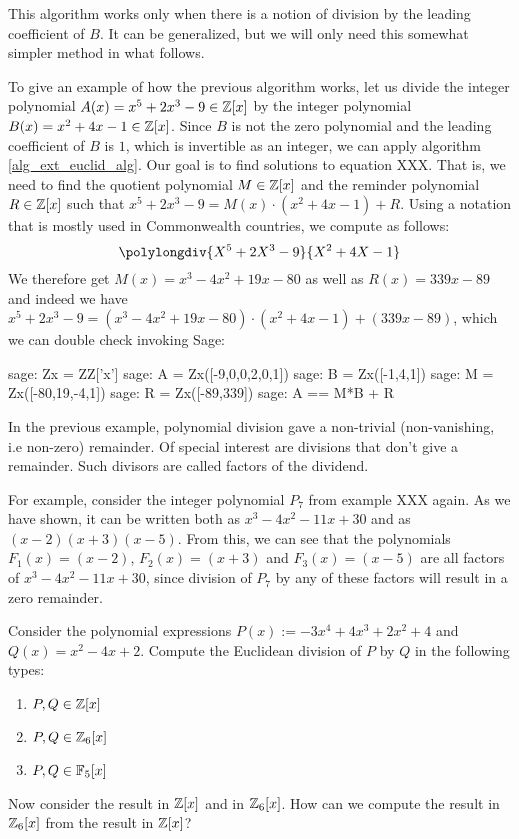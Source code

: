 This algorithm works only when there is a notion of division by the leading coefficient of $B$. It can be generalized, but we will only need this somewhat simpler method in what follows.
\begin{example} To give an example of how the previous algorithm works, let us divide the integer polynomial $A(x)=x^5+2x^3-9\in \mathbb{Z}[x]$ by the integer polynomial $B(x)=x^2+4x-1\in\mathbb{Z}[x]$. Since $B$ is not the zero polynomial and the leading coefficient of $B$ is $1$, which is invertible as an integer, we can apply algorithm \ref{alg_ext_euclid_alg}. Our goal is to find solutions to equation XXX. That is, we need to find the quotient polynomial $M\in\mathbb{Z}[x]$ and the reminder polynomial $R \in \mathbb{Z}[x]$ such that $x^5+2x^3-9 = M(x)\cdot (x^2+4x-1) + R$. Using a notation that is mostly used in Commonwealth countries, we compute as follows:
\begin{equation}
\polylongdiv{X^5+2X^3-9}{X^2+4X-1}
\end{equation}
We therefore get $M(x)=x^3-4x^2+19x-80$ as well as $R(x)=339x-89$ and indeed we have $x^5+2x^3-9 = (x^3-4x^2+19x-80)\cdot (x^2+4x-1) + (339x-89)$, which we can double check invoking Sage:
\begin{sagecommandline}
sage: Zx = ZZ['x']
sage: A = Zx([-9,0,0,2,0,1])
sage: B = Zx([-1,4,1])
sage: M = Zx([-80,19,-4,1])
sage: R = Zx([-89,339])
sage: A == M*B + R
\end{sagecommandline}
\end{example}
\begin{example} In the previous example, polynomial division gave a non-trivial (non-vanishing, i.e non-zero) remainder. Of special interest are divisions that don't give a remainder. Such divisors are called factors of the dividend. 

For example, consider the integer polynomial $P_7$ from example XXX again. As we have shown, it can be written both as $x^3 - 4 x^2 - 11 x + 30$ and as $(x-2)(x + 3)(x-5)$. From this, we can see that the polynomials $F_1(x)=(x-2)$, $F_2(x)=(x+3)$ and $F_3(x)=(x-5)$ are all factors of $x^3 - 4 x^2 - 11 x + 30$, since division of $P_7$ by any of these factors will result in a zero remainder.
\end{example}
\begin{exercise} Consider the polynomial expressions $P(x):= -3x^4 + 4x^3 + 2x^2 +4$ and $Q(x)= x^2-4x+2$. Compute the Euclidean division of $P$ by $Q$ in the following types:
\begin{enumerate}
\item $P,Q\in \mathbb{Z}[x]$
\item $P,Q\in \mathbb{Z}_6[x]$
\item $P,Q\in \mathbb{F}_5[x]$
\end{enumerate}
Now consider the result in $\mathbb{Z}[x]$ and in $\mathbb{Z}_6[x]$. How can we compute the result in $\mathbb{Z}_6[x]$ from the result in $\mathbb{Z}[x]$?
\end{exercise}
